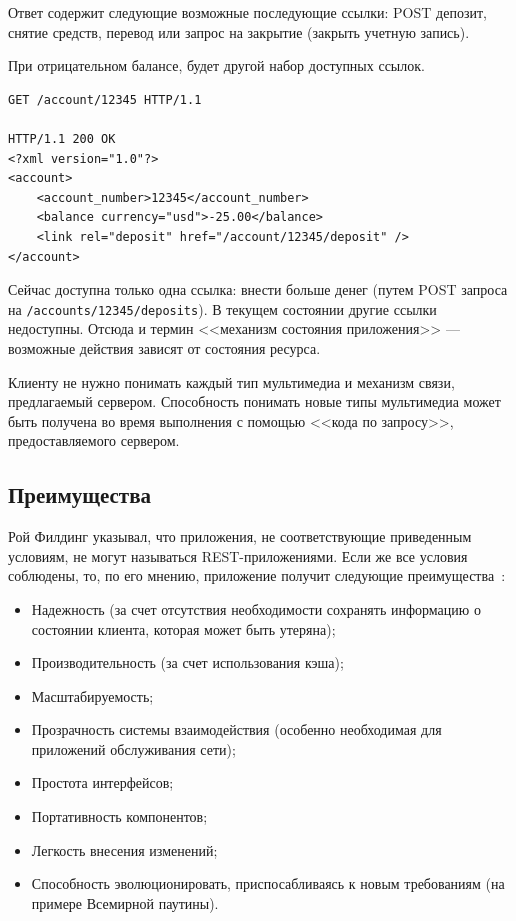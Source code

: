 \documentclass[a4page]{article}
\begin{document}
Ответ содержит следующие возможные последующие ссылки:
POST депозит, снятие средств, перевод или запрос на закрытие (закрыть учетную запись).

При отрицательном балансе, будет другой набор доступных ссылок.

\begin{lstlisting}
GET /account/12345 HTTP/1.1

HTTP/1.1 200 OK
<?xml version="1.0"?>
<account>
    <account_number>12345</account_number>
    <balance currency="usd">-25.00</balance>
    <link rel="deposit" href="/account/12345/deposit" />
</account>
\end{lstlisting}

Сейчас доступна только одна ссылка: внести больше денег
(путем POST запроса на \texttt{/accounts/12345/deposits}).
В текущем состоянии другие ссылки недоступны.
Отсюда и термин <<механизм состояния приложения>> --- возможные действия зависят от состояния ресурса.

Клиенту не нужно понимать каждый тип мультимедиа и механизм связи, предлагаемый сервером.
Способность понимать новые типы мультимедиа может быть получена во время выполнения
с помощью <<кода по запросу>>, предоставляемого сервером.

\subsection{Преимущества}
Рой Филдинг указывал, что приложения, не соответствующие приведенным условиям,
не могут называться REST-приложениями. Если же все условия соблюдены, то, по его мнению,
приложение получит следующие преимущества~\cite{REST}:

\begin{itemize}
	\item Надежность (за счет отсутствия необходимости сохранять информацию о состоянии клиента,
	      которая может быть утеряна);
	\item Производительность (за счет использования кэша);
	\item Масштабируемость;
	\item Прозрачность системы взаимодействия (особенно необходимая для приложений обслуживания сети);
	\item Простота интерфейсов;
	\item Портативность компонентов;
	\item Легкость внесения изменений;
	\item Способность эволюционировать, приспосабливаясь к новым требованиям (на примере Всемирной паутины).
\end{itemize}
\end{document}
